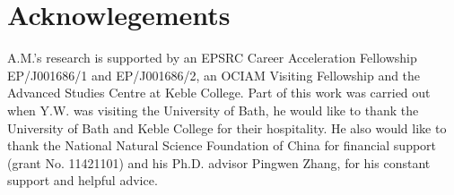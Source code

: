 \documentclass[10pt, a4paper]{article}
\begin{document}
\section*{Acknowlegements}

A.M.'s research is supported by an EPSRC Career Acceleration Fellowship EP/J001686/1 and EP/J001686/2, an OCIAM Visiting Fellowship and the Advanced Studies Centre at Keble College.
Part of this work was carried out when Y.W. was visiting the University of Bath, he would like to thank the University of Bath and Keble College for their hospitality.
He also would like to thank the National Natural Science Foundation of China for financial support (grant No. 11421101) and his Ph.D. advisor Pingwen Zhang, for his constant support and helpful advice.


\end{document}
